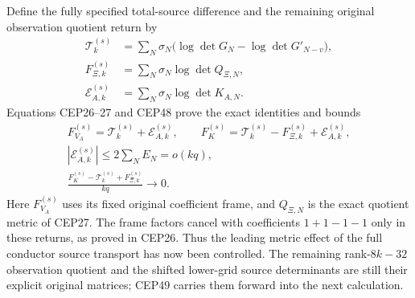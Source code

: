 \documentclass[11pt,a4paper]{article}
\begin{document}
Define the fully specified total-source difference and the
remaining original observation quotient return by
\[
 \begin{split}
 \mathcal T_k^{(s)}
   &=\sum_N\sigma_N
          \bigl(\log\det G_N-\log\det G'_{N-v}\bigr),\\
 F_{\Xi,k}^{(s)}&=\sum_N\sigma_N\log\det Q_{\Xi,N},\\
 \mathcal E_{A,k}^{(s)}
   &=\sum_N\sigma_N\log\det K_{A,N}.
 \end{split}
\]
Equations CEP26--27 and CEP48 prove the exact identities and bounds
\[
 \begin{gathered}
 F_{V_A}^{(s)}
      =\mathcal T_k^{(s)}+\mathcal E_{A,k}^{(s)},\qquad
 F_K^{(s)}
      =\mathcal T_k^{(s)}-F_{\Xi,k}^{(s)}
                              +\mathcal E_{A,k}^{(s)},\\
 |\mathcal E_{A,k}^{(s)}|\le2\sum_N E_N=o(kq),\\
 \frac{F_K^{(s)}-\mathcal T_k^{(s)}+F_{\Xi,k}^{(s)}}{kq}
        \longrightarrow0 .
 \end{gathered}\tag{CEP49}
\]
Here $F_{V_A}^{(s)}$ uses its fixed original coefficient frame,
and $Q_{\Xi,N}$ is the exact quotient metric of CEP27.
The frame factors cancel with coefficients $1+1-1-1$ only in
these returns, as proved in CEP26. Thus the leading metric
effect of the full conductor source transport has now been
controlled. The remaining rank-$8k-32$ observation quotient
and the shifted lower-grid source determinants are still their
explicit original matrices; CEP49 carries them forward into
the next calculation.

\end{document}
